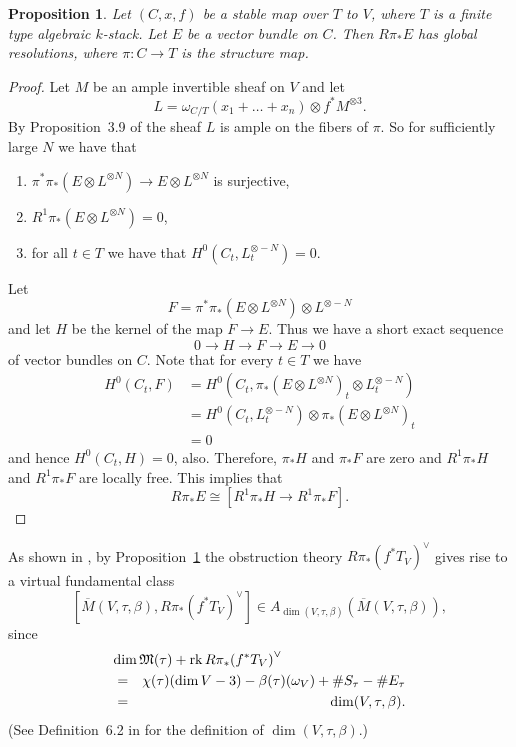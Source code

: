 \documentclass{article}
\newtheorem{prop}{Proposition}
\newcommand{\dual}[1]{{{#1}^{\vee}}}
\newcommand{\upst}{^{\ast}}
\newcommand{\lst}{_{\ast}}
\newcommand{\MM}{{\frak M}}
\newcommand{\rk}{\mathop{\rm rk}}
\newcommand{\ol}{\overline}
\renewcommand{\t}{_{\tau}}
\newcommand{\ses}[5]%
{0\longrightarrow#1\stackrel{#2}{ \longrightarrow}#3\stackrel{#4}{
\longrightarrow}#5\longrightarrow0}
\begin{document}
\begin{prop} \label{egr}
Let $(C,x,f)$ be a stable map over $T$ to $V$, where $T$ is a finite
type algebraic $k$-stack. Let $E$ be a vector bundle on $C$. Then
$R\pi\lst E$ has global resolutions, where $\pi:C\rightarrow T$ is the
structure map.
\end{prop}
\begin{proof}
Let $M$ be an ample invertible sheaf on $V$ and let
\[L=\omega_{C/T}(x_1+\ldots+x_n)\otimes f\upst M^{\otimes 3}.\]
By Proposition~3.9 of \cite{BM} the sheaf $L$ is ample on the fibers
of $\pi$. So for sufficiently large $N$ we have that
\begin{enumerate}
\item $\pi\upst\pi\lst(E\otimes L^{\otimes N})\rightarrow E\otimes
L^{\otimes N} $ is surjective,
\item $R^1\pi\lst(E\otimes L^{\otimes N})=0$,
\item for all $t\in T$ we have that $H^0(C_t,L^{\otimes -N}_t)=0$.
\end{enumerate}
Let $$F=\pi\upst\pi\lst(E\otimes L^{\otimes N})\otimes L^{\otimes
-N}$$ and let $H$ be the kernel of the map $F\to E$. Thus we have a
short exact sequence
\[\ses{H}{}{F}{}{E}\] of vector bundles on $C$. Note that for every
$t\in T$ we have
\begin{align*}
  H^0(C_t,F) &= H^0(C_t,\pi\lst(E\otimes L^{\otimes N})_t\otimes L_t^{\otimes -N}) \\
             &= H^0(C_t,L_t^{\otimes -N})\otimes\pi\lst(E\otimes L^{\otimes N})_t  \\
             &= 0
\end{align*}
and hence $H^0(C_t,H)=0$,
also. Therefore, $\pi\lst H$ and $\pi\lst F$ are zero and $R^1\pi\lst
H$ and $R^1\pi\lst F$ are locally free. This implies that $$R\pi\lst
E\cong [R^1\pi\lst H\rightarrow R^1\pi\lst F].$$
\end{proof}

As shown in \cite{BF}, by Proposition~\ref{egr} the obstruction theory
$\dual{R\pi\lst(f\upst T_V)}$ gives rise to a virtual fundamental
class
\[[\ol{M}(V,\tau,\beta),\dual{R\pi\lst(f\upst T_V)}]\in
A_{\dim(V,\tau,\beta)}(\ol{M}(V,\tau,\beta)),\] since
\begin{eqnarray*}
\lefteqn{\dim\MM(\tau) + \rk \dual{R\pi\lst(f\upst T_V)} }\\ & = &
\chi(\tau)(\dim V-3)-\beta(\tau)(\omega_V)+\#S\t-\#E\t \\
 & = &  \dim(V,\tau,\beta).
\end{eqnarray*}
(See Definition~6.2 in \cite{BM} for the definition of
$\dim(V,\tau,\beta)$.)
\end{document}
